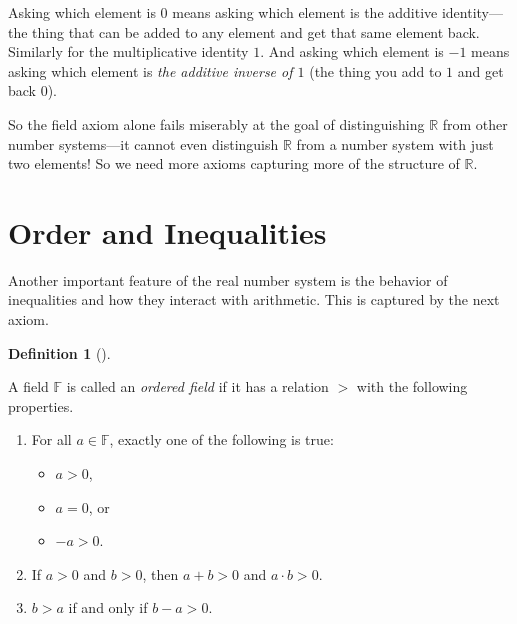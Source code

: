 \documentclass[
  letterpaper,
  DIV=11,
  numbers=noendperiod]{scrreprt}
\providecommand{\tightlist}{%
  \setlength{\itemsep}{0pt}\setlength{\parskip}{0pt}}
\def\R{\mathbb R}
\theoremstyle{plain}
\theoremstyle{definition}
\theoremstyle{plain}
\theoremstyle{plain}
\theoremstyle{definition}
\theoremstyle{definition}
\newtheorem{definition}{Definition}[chapter]
\theoremstyle{remark}
\begin{document}
\begin{tcolorbox}[enhanced jigsaw, titlerule=0mm, opacitybacktitle=0.6, leftrule=.75mm, bottomrule=.15mm, left=2mm, arc=.35mm, colback=white, rightrule=.15mm, colframe=quarto-callout-tip-color-frame, toptitle=1mm, breakable, opacityback=0, colbacktitle=quarto-callout-tip-color!10!white, bottomtitle=1mm, title=\textcolor{quarto-callout-tip-color}{\faLightbulb}\hspace{0.5em}{Hint}, coltitle=black, toprule=.15mm]

Asking which element is \(0\) means asking which element is the additive
identity---the thing that can be added to any element and get that same
element back. Similarly for the multiplicative identity \(1\). And
asking which element is \(-1\) means asking which element is \emph{the
additive inverse of \(1\)} (the thing you add to \(1\) and get back
\(0\)).

\end{tcolorbox}

So the field axiom alone fails miserably at the goal of distinguishing
\(\R\) from other number systems---it cannot even distinguish \(\R\)
from a number system with just two elements! So we need more axioms
capturing more of the structure of \(\R\).

\section{Order and Inequalities}\label{order-and-inequalities}

Another important feature of the real number system is the behavior of
inequalities and how they interact with arithmetic. This is captured by
the next axiom.

\begin{definition}[]\protect\hypertarget{def-ordered-field}{}\label{def-ordered-field}

A field \(\mathbb{F}\) is called an \emph{ordered field} if it has a
relation \(>\) with the following properties.

\begin{enumerate}
\def\labelenumi{\arabic{enumi}.}
\item
  For all \(a\in\mathbb{F}\), exactly one of the following is true:

  \begin{itemize}
  \tightlist
  \item
    \(a>0\),
  \item
    \(a=0\), or
  \item
    \(-a>0\).
  \end{itemize}
\item
  If \(a>0\) and \(b>0\), then \(a+b>0\) and \(a\cdot b>0\).
\item
  \(b>a\) if and only if \(b-a>0\).
\end{enumerate}

\end{definition}
\end{document}

